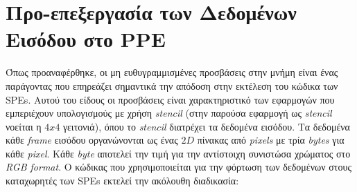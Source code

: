 \section{Προ-επεξεργασία των Δεδομένων Εισόδου στο PPE}
\label{section:sect53}
\indent
Όπως προαναφέρθηκε, οι μη ευθυγραμμισμένες προσβάσεις στην μνήμη είναι ένας παράγοντας που επηρεάζει σημαντικά την απόδοση στην εκτέλεση του κώδικα των \acp{SPE}. Αυτού του είδους οι προσβάσεις είναι χαρακτηριστικό των εφαρμογών που εμπεριέχουν υπολογισμούς με χρήση \textsl{stencil} (στην παρούσα εφαρμογή ως \textsl{stencil} νοείται η \(4x4\) γειτονιά), όπου το \textsl{stencil} διατρέχει τα δεδομένα εισόδου. Τα δεδομένα κάθε \textsl{frame} εισόδου οργανώνονται ως ένας \(2D\) πίνακας από \textsl{pixels} με τρία \textsl{bytes} για κάθε \textsl{pixel}. Kάθε \textsl{byte} αποτελεί την τιμή για την αντίστοιχη συνιστώσα χρώματος στο \textsl{RGB format}. Ο κώδικας που χρησιμοποιείται για την φόρτωση των δεδομένων στους καταχωρητές των \acp{SPE} εκτελεί την ακόλουθη διαδικασία:

